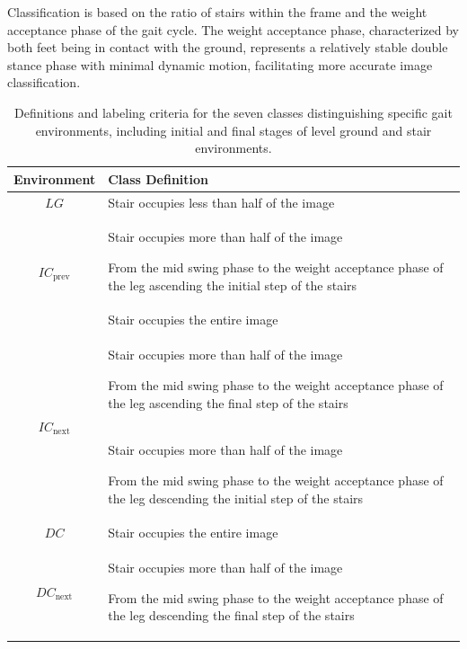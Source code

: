 \documentclass[journal,article,submit,pdftex,moreauthors]{Definitions/mdpi}
\begin{document}
Classification is based on the ratio of stairs within the frame and the weight acceptance phase of the gait cycle. The weight acceptance phase, characterized by both feet being in contact with the ground, represents a relatively stable double stance phase with minimal dynamic motion, facilitating more accurate image classification.

\begin{table}[t!] 
\caption{Definitions and labeling criteria for the seven classes distinguishing specific gait environments, including initial and final stages of level ground and stair environments.\label{tab5}}
\begin{tabularx}{\textwidth}{cX}%
\toprule
\textbf{Environment}&\textbf{Class Definition}\\
\midrule
$LG$		                   & Stair occupies less than half of the image			\\
\hline
\multirow[m]{2}{*}{$IC_{\text{prev}}$}	& Stair occupies more than half of the image \par From the mid swing phase to the weight acceptance phase of the leg ascending the initial step of the stairs\\
\hline
$IC$	& Stair occupies the entire image			\\
\hline
\multirow[m]{2}{*}{$IC_{\text{next}}$}		 &Stair occupies more than half of the image \par From the mid swing phase to the weight acceptance phase of the leg ascending the final step of the stairs\\
\hline
\multirow[m]{2}{*}{$DC_{\text{prev}}$}     & Stair occupies more than half of the image \par From the mid swing phase to the weight acceptance phase of the leg descending the initial step of the stairs\\
\hline
$DC$	& Stair occupies the entire image\\
\hline
\multirow[m]{2}{*}{$DC_{\text{next}}$}	    & Stair occupies more than half of the image \par From the mid swing phase to the weight acceptance phase of the leg descending the final step of the stairs\\
\bottomrule
\end{tabularx}
\end{table}
\end{document}
